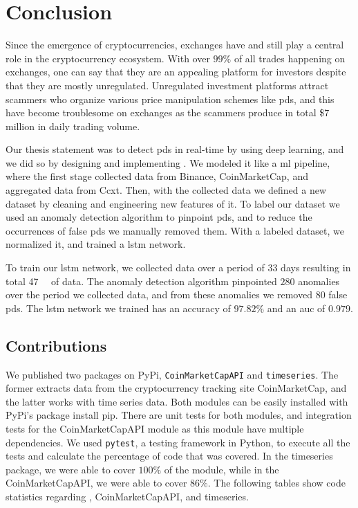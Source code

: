 
\chapter{Conclusion}\label{ch:conclusion}\glsresetall
Since the emergence of cryptocurrencies, exchanges have and still play a central role in the cryptocurrency ecosystem. With over $99\%$ of all trades happening on exchanges, one can say that they are an appealing platform for investors despite that they are mostly unregulated. Unregulated investment platforms attract scammers who organize various price manipulation schemes like \acp{pd}, and this have become troublesome on exchanges as the scammers produce in total \$$7$ million in daily trading volume.

Our thesis statement was to detect \acp{pd} in real-time by using deep learning, and we did so by designing and implementing \project. We modeled it like a \ac{ml} pipeline, where the first stage collected data from Binance, CoinMarketCap, and aggregated data from Ccxt. Then, with the collected data we defined a new dataset by cleaning and engineering new features of it. To label our dataset we used an anomaly detection algorithm to pinpoint \acp{pd}, and to reduce the occurrences of false \acp{pd} we manually removed them. With a labeled dataset, we normalized it, and trained a \ac{lstm} network.

To train our \ac{lstm} network, we collected data over a period of $33$ days resulting in total \SI{47}{\giga\byte} of data. The anomaly detection algorithm pinpointed $280$ anomalies over the period we collected data, and from these anomalies we removed $80$ false \acp{pd}. The \ac{lstm} network we trained has an accuracy of $97.82\%$ and an \ac{auc} of $0.979$.

\section{Contributions}
We published two packages on PyPi, \texttt{CoinMarketCapAPI} and \texttt{timeseries}. The former extracts data from the cryptocurrency tracking site CoinMarketCap, and the latter works with time series data. Both modules can be easily installed with PyPi's package install pip. There are unit tests for both modules, and integration tests for the CoinMarketCapAPI module as this module have multiple dependencies. We used \texttt{pytest}, a testing framework in Python, to execute all the tests and calculate the percentage of code that was covered. In the timeseries package, we were able to cover $100\%$ of the module, while in the CoinMarketCapAPI, we were able to cover $86\%$. The following tables show code statistics regarding \project, CoinMarketCapAPI, and timeseries.

